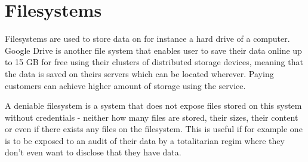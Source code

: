 \section{Filesystems}
Filesystems are used to store data on for instance a hard drive of a computer. Google Drive is another file system that enables user to save their data online up to 15 GB for free\cite{noauthor_cloud_nodate} using their clusters of distributed storage devices, meaning that the data is saved on theirs servers which can be located wherever\cite{noauthor_distributed_nodate}. Paying customers can achieve higher amount of storage using the service.

A deniable filesystem is a system that does not expose files stored on this system without credentials - neither how many files are stored, their sizes, their content or even if there exists any files on the filesystem\cite{peters_defy_2014}. This is useful if for example one is to be exposed to an audit of their data by a totalitarian regim where they don't even want to disclose that they have data. 